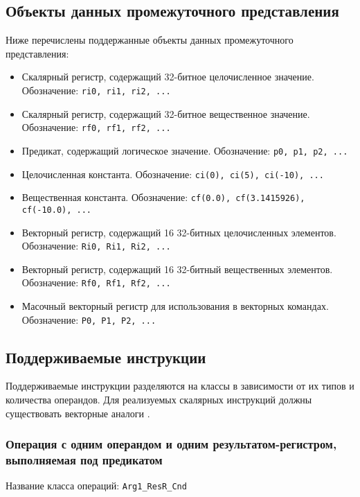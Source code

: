 \documentclass[a4paper,12pt]{extarticle}                     %
\numberwithin{equation}{section}                             %
\numberwithin{figure}{section}                               %
\numberwithin{table}{section}                                %
\theoremstyle{plain}                                         %
\numberwithin{theorem}{section}                              %
\numberwithin{lemma}{section}                                %
\numberwithin{definition}{section}                           %
\begin{document}
\subsection{Объекты данных промежуточного представления}

Ниже перечислены поддержанные объекты данных промежуточного представления:

\begin{itemize}
\item Скалярный регистр, содержащий 32-битное целочисленное значение. Обозначение: \texttt{ri0, ri1, ri2, ...}
\item Скалярный регистр, содержащий 32-битное вещественное значение. Обозначение: \texttt{rf0, rf1, rf2, ...}
\item Предикат, содержащий логическое значение. Обозначение: \texttt{p0, p1, p2, ...}
\item Целочисленная константа. Обозначение: \texttt{ci(0), ci(5), ci(-10), ...}
\item Вещественная константа. Обозначение: \texttt{cf(0.0), cf(3.1415926), cf(-10.0), ...}
\item Векторный регистр, содержащий 16 32-битных целочисленных элементов. Обозначение: \texttt{Ri0, Ri1, Ri2, ...}
\item Векторный регистр, содержащий 16 32-битный вещественных элементов. Обозначение: \texttt{Rf0, Rf1, Rf2, ...}
\item Масочный векторный регистр для использования в векторных командах. Обозначение: \texttt{P0, P1, P2, ...}

\end{itemize}

\subsection{Поддерживаемые инструкции}

Поддерживаемые инструкции разделяются на классы в зависимости от их типов и количества операндов. Для реализуемых скалярных инструкций должны существовать векторные аналоги \cite{IntelSDM}.

\newpage

\subsubsection{Операция с одним операндом и одним результатом-регистром, выполняемая под предикатом}

Название класса операций: \texttt{Arg1\_ResR\_Cnd}
\end{document}
